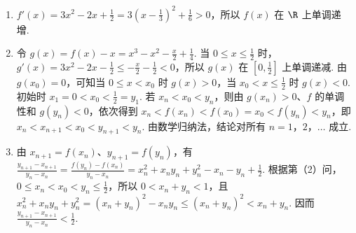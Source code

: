 \begin{solution}
\begin{enumerate}
\item \(f'(x)=3x^2-2x+\frac{1}{2}=3\left(x-\frac{1}{3}\right)^2+\frac{1}{6}>0\)，所以 \(f(x)\) 在 \(\R\) 上单调递增.
\item 令 \(g(x)=f(x)-x=x^3-x^2-\frac{x}{2}+\frac{1}{4}\). 当 \(0\leqslant x\leqslant\frac{1}{2}\) 时，\(g'(x)=3x^2-2x-\frac{1}{2}\leqslant-\frac{x}{2}-\frac{1}{2}<0\)，所以 \(g(x)\) 在 \(\left[0,\frac{1}{2}\right]\) 上单调递减. 由 \(g(x_0)=0\)，可知当 \(0\leqslant x<x_0\) 时 \(g(x)>0\)，当 \(x_0<x\leqslant\frac{1}{2}\) 时 \(g(x)<0\). 初始时 \(x_1=0<x_0<\frac{1}{2}=y_1\). 若 \(x_n<x_0<y_n\)，则由 \(g(x_n)>0\)、\(f\) 的单调性和 \(g(y_n)<0\)，依次得到 \(x_n<f(x_n)<f(x_0)=x_0<f(y_n)<y_n\)，即 \(x_n<x_{n+1}<x_0<y_{n+1}<y_n\). 由数学归纳法，结论对所有 \(n=1\)，\(2\)，\(\dots\) 成立.
\item 由 \(x_{n+1}=f(x_n)\)、\(y_{n+1}=f(y_n)\)，有 \(\frac{y_{n+1}-x_{n+1}}{y_n-x_n}=\frac{f(y_n)-f(x_n)}{y_n-x_n}=x_n^2+x_ny_n+y_n^2-x_n-y_n+\frac{1}{2}\). 根据第（2）问，\(0\leqslant x_n<x_0<y_n\leqslant\frac{1}{2}\)，所以 \(0<x_n+y_n<1\)，且 \(x_n^2+x_ny_n+y_n^2=(x_n+y_n)^2-x_ny_n\leqslant(x_n+y_n)^2<x_n+y_n\). 因而 \(\frac{y_{n+1}-x_{n+1}}{y_n-x_n}<\frac{1}{2}\).
\end{enumerate}
\end{solution}
